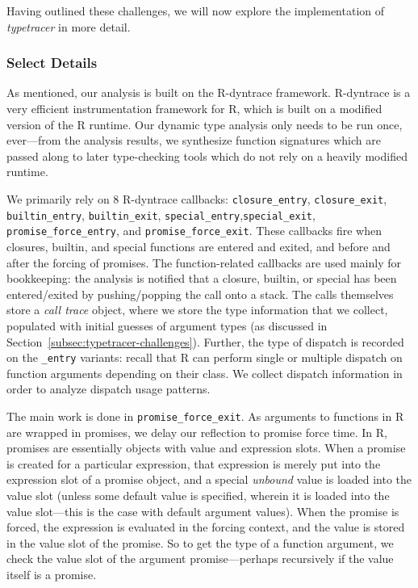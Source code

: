 \documentclass[acmsmall,review,anonymous]{acmart}\settopmatter{printfolios=true,printccs=false,printacmref=false}
\newcommand{\typetracer}{\emph{typetracer}\xspace} %
\begin{document}
Having outlined these challenges, we will now explore the implementation of \typetracer in more detail.

%
%
\subsubsection{Select Details}

As mentioned, our analysis is built on the R-dyntrace framework.  R-dyntrace
is a very efficient instrumentation framework for R, which is built on a
modified version of the R runtime.  Our dynamic type analysis only needs to
be run once, ever---from the analysis results, we synthesize function
signatures which are passed along to later type-checking tools which do not
rely on a heavily modified runtime.

We primarily rely on 8 R-dyntrace callbacks: \texttt{closure\_entry},
\texttt{closure\_exit}, \texttt{builtin\_entry}, \texttt{builtin\_exit},
\texttt{special\_entry},\texttt{special\_exit},
\texttt{promise\_force\_entry}, and \texttt{promise\_force\_exit}.  These
callbacks fire when closures, builtin, and special functions are entered and
exited, and before and after the forcing of promises.  The function-related
callbacks are used mainly for bookkeeping: the analysis is notified that a
closure, builtin, or special has been entered/exited by pushing/popping the
call onto a stack.  The calls themselves store a {\it call trace} object,
where we store the type information that we collect, populated with initial
guesses of argument types (as discussed in
Section~\ref{subsec:typetracer-challenges}).  Further, the type of dispatch
is recorded on the {\tt \_entry} variants: recall that R can perform single or multiple dispatch on function arguments depending on their class.
We collect dispatch information in order to analyze dispatch usage patterns.

The main work is done in {\tt promise\_force\_exit}.  As arguments to
functions in R are wrapped in promises, we delay our reflection to promise
force time.  In R, promises are essentially objects with value and
expression slots.  When a promise is created for a particular expression,
that expression is merely put into the expression slot of a promise object,
and a special {\it unbound} value is loaded into the value slot (unless some
default value is specified, wherein it is loaded into the value slot---this
is the case with default argument values).  When the promise is forced, the
expression is evaluated in the forcing context, and the value is stored in
the value slot of the promise.  So to get the type of a function argument,
we check the value slot of the argument promise---perhaps recursively if the
value itself is a promise.
\end{document}
